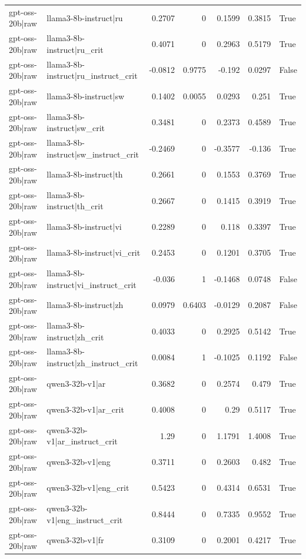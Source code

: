 \begin{table}
\begin{tabular}{l l r r r r l}
gpt-oss-20b|raw & llama3-8b-instruct|ru & 0.2707 & 0 & 0.1599 & 0.3815 & True \\
gpt-oss-20b|raw & llama3-8b-instruct|ru_crit & 0.4071 & 0 & 0.2963 & 0.5179 & True \\
gpt-oss-20b|raw & llama3-8b-instruct|ru_instruct_crit & -0.0812 & 0.9775 & -0.192 & 0.0297 & False \\
gpt-oss-20b|raw & llama3-8b-instruct|sw & 0.1402 & 0.0055 & 0.0293 & 0.251 & True \\
gpt-oss-20b|raw & llama3-8b-instruct|sw_crit & 0.3481 & 0 & 0.2373 & 0.4589 & True \\
gpt-oss-20b|raw & llama3-8b-instruct|sw_instruct_crit & -0.2469 & 0 & -0.3577 & -0.136 & True \\
gpt-oss-20b|raw & llama3-8b-instruct|th & 0.2661 & 0 & 0.1553 & 0.3769 & True \\
gpt-oss-20b|raw & llama3-8b-instruct|th_crit & 0.2667 & 0 & 0.1415 & 0.3919 & True \\
gpt-oss-20b|raw & llama3-8b-instruct|vi & 0.2289 & 0 & 0.118 & 0.3397 & True \\
gpt-oss-20b|raw & llama3-8b-instruct|vi_crit & 0.2453 & 0 & 0.1201 & 0.3705 & True \\
gpt-oss-20b|raw & llama3-8b-instruct|vi_instruct_crit & -0.036 & 1 & -0.1468 & 0.0748 & False \\
gpt-oss-20b|raw & llama3-8b-instruct|zh & 0.0979 & 0.6403 & -0.0129 & 0.2087 & False \\
gpt-oss-20b|raw & llama3-8b-instruct|zh_crit & 0.4033 & 0 & 0.2925 & 0.5142 & True \\
gpt-oss-20b|raw & llama3-8b-instruct|zh_instruct_crit & 0.0084 & 1 & -0.1025 & 0.1192 & False \\
gpt-oss-20b|raw & qwen3-32b-v1|ar & 0.3682 & 0 & 0.2574 & 0.479 & True \\
gpt-oss-20b|raw & qwen3-32b-v1|ar_crit & 0.4008 & 0 & 0.29 & 0.5117 & True \\
gpt-oss-20b|raw & qwen3-32b-v1|ar_instruct_crit & 1.29 & 0 & 1.1791 & 1.4008 & True \\
gpt-oss-20b|raw & qwen3-32b-v1|eng & 0.3711 & 0 & 0.2603 & 0.482 & True \\
gpt-oss-20b|raw & qwen3-32b-v1|eng_crit & 0.5423 & 0 & 0.4314 & 0.6531 & True \\
gpt-oss-20b|raw & qwen3-32b-v1|eng_instruct_crit & 0.8444 & 0 & 0.7335 & 0.9552 & True \\
gpt-oss-20b|raw & qwen3-32b-v1|fr & 0.3109 & 0 & 0.2001 & 0.4217 & True \\

\end{tabular}
\end{table}
